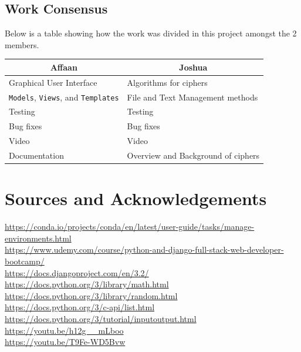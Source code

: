 \documentclass[a4paper, 12pt, titlepage]{report}
\begin{document}
\section{Work Consensus}
Below is a table showing how the work was divided in this project amongst the 2 members.
\begin{table}[H]
\centering
\begin{tabular}{@{}ll@{}}
\toprule
\multicolumn{1}{c}{Affaan}   & \multicolumn{1}{c}{Joshua}         \\ \midrule
Graphical User Interface     & Algorithms for ciphers             \\
\texttt{Models}, \texttt{Views}, and \texttt{Templates} & File and Text Management methods            \\
Testing                      & Testing                            \\
Bug fixes                    & Bug fixes                          \\
Video                        & Video                              \\
Documentation                & Overview and Background of ciphers \\ \bottomrule
\end{tabular}
\end{table}
\chapter{Sources and Acknowledgements}
\url{https://conda.io/projects/conda/en/latest/user-guide/tasks/manage-environments.html}\\
\url{https://www.udemy.com/course/python-and-django-full-stack-web-developer-bootcamp/}\\
\url{https://docs.djangoproject.com/en/3.2/}\\
\url{https://docs.python.org/3/library/math.html}\\
\url{https://docs.python.org/3/library/random.html}\\
\url{https://docs.python.org/3/c-api/list.html}\\
\url{https://docs.python.org/3/tutorial/inputoutput.html}\\
\url{https://youtu.be/h12g__mLboo}\\
\url{https://youtu.be/T9Fe-WD5Bvw}\\
\end{document}
